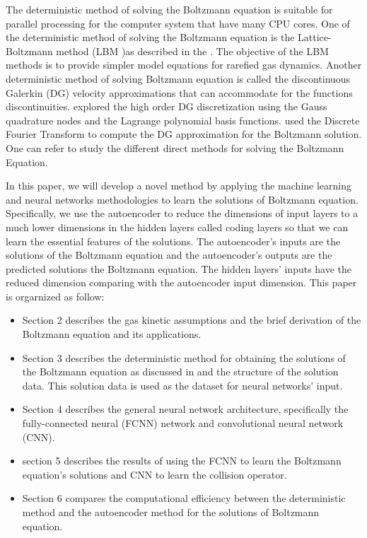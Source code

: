 \documentclass{article}
\begin{document}
The deterministic method of solving the Boltzmann equation is suitable for parallel processing for the computer system that have many CPU cores. One of the deterministic method of solving the Boltzmann equation is the Lattice-Boltzmann method (LBM )as described in the \cite{LBM1, LBM2}. The objective of the LBM methods is to provide simpler model equations for rarefied gas dynamics. Another deterministic method of solving Boltzmann equation is called the discontinuous Galerkin (DG) velocity approximations that can accommodate for the functions discontinuities. \cite{Alekseenko1, Alekseenko2} explored the high order DG discretization using the Gauss quadrature nodes and the Lagrange polynomial basis functions. \cite{Alekseenko4} used the Discrete Fourier Transform to compute the DG approximation for the Boltzmann solution. One can refer \cite{VVAristo} to study the different direct methods for solving the Boltzmann Equation.

In this paper, we will develop a novel method by applying the machine learning and neural networks methodologies to learn the solutions of Boltzmann equation. Specifically, we use the autoencoder to reduce the dimensions of  input layers to a much lower dimensions in the hidden layers called coding layers so that we can learn the essential features of the solutions. The autoencoder's inputs are the solutions of the Boltzmann equation and the autoencoder's outputs are the predicted solutions the Boltzmann equation. The hidden layers' inputs have the reduced dimension comparing with the autoencoder input dimension. This paper is orgarnized as follow:
\begin{itemize}
	\item Section 2 describes the gas kinetic assumptions and the brief derivation of the Boltzmann equation and its applications.
	\item Section 3 describes the deterministic method for obtaining the solutions of the Boltzmann equation as discussed in \cite{Alekseenko2, Alekseenko4} and the structure of the solution data. This solution data is used as the dataset for neural networks' input.
	\item Section 4 describes the general neural network architecture, specifically the fully-connected neural (FCNN) network and convolutional neural network (CNN).
	\item section 5 describes the results of using the FCNN to learn the Boltzmann equation's solutions and CNN to learn the collision operator.
	\item Section 6 compares the computational efficiency between the deterministic method and the autoencoder method for the solutions of Boltzmann equation.
\end{itemize}
\end{document}
